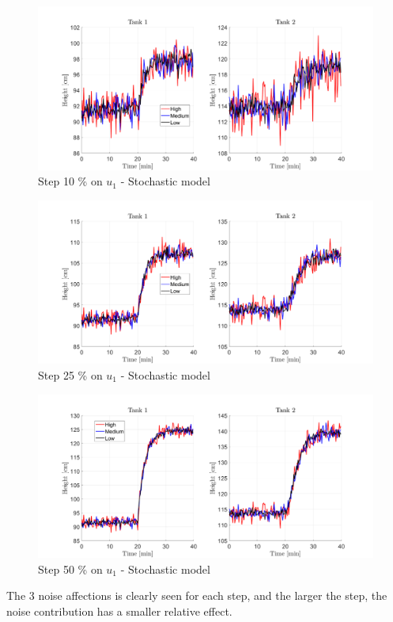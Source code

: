 \begin{figure}[H]
    \centering
    \includegraphics[width=1\textwidth]{Figures/Pr3.2_Stoc_step10.png}
    \caption{Step 10 \% on $u_1$ - Stochastic model}
    \label{fig:stoc_step_10}
\end{figure}
\begin{figure}[H]
    \centering
    \includegraphics[width=1\textwidth]{Figures/Pr3.2_Stoc_step25.png}
    \caption{Step 25 \% on $u_1$ - Stochastic model}
    \label{fig:stoc_step_25}
\end{figure}
\begin{figure}[H]
    \centering
    \includegraphics[width=1\textwidth]{Figures/Pr3.2_Stoc_step50.png}
    \caption{Step 50 \% on $u_1$ - Stochastic model}
    \label{fig:stoc_step_50}
\end{figure}
The 3 noise affections is clearly seen for each step, and the larger the step, the noise contribution has a smaller relative effect.